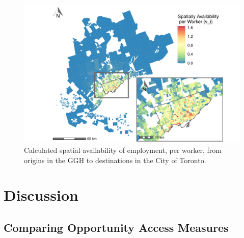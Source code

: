 \documentclass[]{elsarticle} %
\begin{document}
\begin{figure}
\includegraphics[width=1\linewidth]{Spatial-Availability_files/figure-latex/plot-avail-Toronto-TTS-per-worker-1} \caption{\label{fig:plot-avail-Toronto-TTS-per-worker}Calculated spatial availability of employment, per worker, from origins in the GGH to destinations in the City of Toronto.}\label{fig:plot-avail-Toronto-TTS-per-worker}
\end{figure}

\hypertarget{discussion}{%
\section{Discussion}\label{discussion}}

\hypertarget{comparing-opportunity-access-measures}{%
\subsection{Comparing Opportunity Access
Measures}\label{comparing-opportunity-access-measures}}
\end{document}
